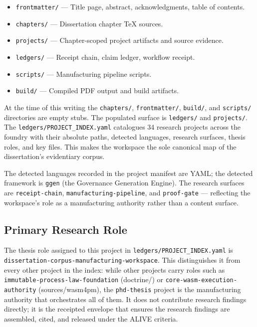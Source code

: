 \begin{itemize}
  \item \texttt{frontmatter/} --- Title page, abstract, acknowledgments, table of contents.
  \item \texttt{chapters/} --- Dissertation chapter \TeX{} sources.
  \item \texttt{projects/} --- Chapter-scoped project artifacts and source evidence.
  \item \texttt{ledgers/} --- Receipt chain, claim ledger, workflow receipt.
  \item \texttt{scripts/} --- Manufacturing pipeline scripts.
  \item \texttt{build/} --- Compiled PDF output and build artifacts.
\end{itemize}

At the time of this writing the \texttt{chapters/}, \texttt{frontmatter/}, \texttt{build/},
and \texttt{scripts/} directories are empty stubs. The populated surface is
\texttt{ledgers/} and \texttt{projects/}. The \texttt{ledgers/PROJECT\_INDEX.yaml}
catalogues 34 research projects across the foundry with their absolute paths, detected
languages, research surfaces, thesis roles, and key files. This makes the workspace the sole
canonical map of the dissertation's evidentiary corpus.

The detected languages recorded in the project manifest are YAML; the detected framework is
\texttt{ggen} (the Governance Generation Engine). The research surfaces are
\texttt{receipt-chain}, \texttt{manufacturing-pipeline}, and \texttt{proof-gate} ---
reflecting the workspace's role as a manufacturing authority rather than a content surface.

\subsection{Primary Research Role}
\label{sec:phd-thesis-identity-role}

The thesis role assigned to this project in \texttt{ledgers/PROJECT\_INDEX.yaml} is
\texttt{dissertation-corpus-manufacturing-workspace}. This distinguishes it from every other
project in the index: while other projects carry roles such as
\texttt{immutable-process-law-foundation} (doctrine/) or
\texttt{core-wasm-execution-authority} (sources/wasm4pm), the \texttt{phd-thesis} project is
the manufacturing authority that orchestrates all of them. It does not contribute research
findings directly; it is the receipted envelope that ensures the research findings are
assembled, cited, and released under the ALIVE criteria.

